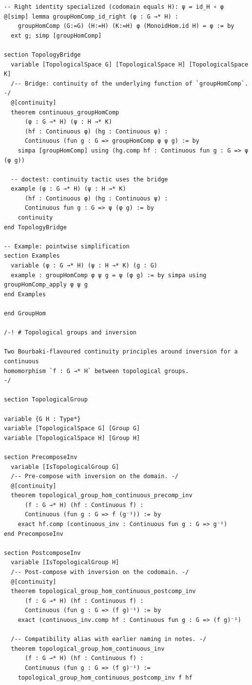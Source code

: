 \documentclass[12pt]{article}
\begin{document}
\begin{lstlisting}
-- Right identity specialized (codomain equals H): ψ = id_H ∘ φ
@[simp] lemma groupHomComp_id_right (φ : G →* H) :
    groupHomComp (G:=G) (H:=H) (K:=H) φ (MonoidHom.id H) = φ := by
  ext g; simp [groupHomComp]

section TopologyBridge
  variable [TopologicalSpace G] [TopologicalSpace H] [TopologicalSpace K]
  /-- Bridge: continuity of the underlying function of `groupHomComp`. -/
  @[continuity]
  theorem continuous_groupHomComp
      (φ : G →* H) (ψ : H →* K)
      (hf : Continuous φ) (hg : Continuous ψ) :
      Continuous (fun g : G => groupHomComp φ ψ g) := by
    simpa [groupHomComp] using (hg.comp hf : Continuous fun g : G => ψ (φ g))

  -- doctest: continuity tactic uses the bridge
  example (φ : G →* H) (ψ : H →* K)
      (hf : Continuous φ) (hg : Continuous ψ) :
      Continuous fun g : G => ψ (φ g) := by
    continuity
end TopologyBridge

-- Example: pointwise simplification
section Examples
  variable (φ : G →* H) (ψ : H →* K) (g : G)
  example : groupHomComp φ ψ g = ψ (φ g) := by simpa using groupHomComp_apply φ ψ g
end Examples

end GroupHom

/-! # Topological groups and inversion

Two Bourbaki-flavoured continuity principles around inversion for a continuous
homomorphism `f : G →* H` between topological groups.
-/

section TopologicalGroup

variable {G H : Type*}
variable [TopologicalSpace G] [Group G]
variable [TopologicalSpace H] [Group H]

section PrecomposeInv
  variable [IsTopologicalGroup G]
  /-- Pre-compose with inversion on the domain. -/
  @[continuity]
  theorem topological_group_hom_continuous_precomp_inv
      (f : G →* H) (hf : Continuous f) :
      Continuous (fun g : G => f (g⁻¹)) := by
    exact hf.comp (continuous_inv : Continuous fun g : G => g⁻¹)
end PrecomposeInv

section PostcomposeInv
  variable [IsTopologicalGroup H]
  /-- Post-compose with inversion on the codomain. -/
  @[continuity]
  theorem topological_group_hom_continuous_postcomp_inv
      (f : G →* H) (hf : Continuous f) :
      Continuous (fun g : G => (f g)⁻¹) := by
    exact (continuous_inv.comp hf : Continuous fun g : G => (f g)⁻¹)

  /-- Compatibility alias with earlier naming in notes. -/
  theorem topological_group_hom_continuous_inv
      (f : G →* H) (hf : Continuous f) :
      Continuous (fun g : G => (f g)⁻¹) :=
    topological_group_hom_continuous_postcomp_inv f hf


\end{lstlisting}
\end{document}
